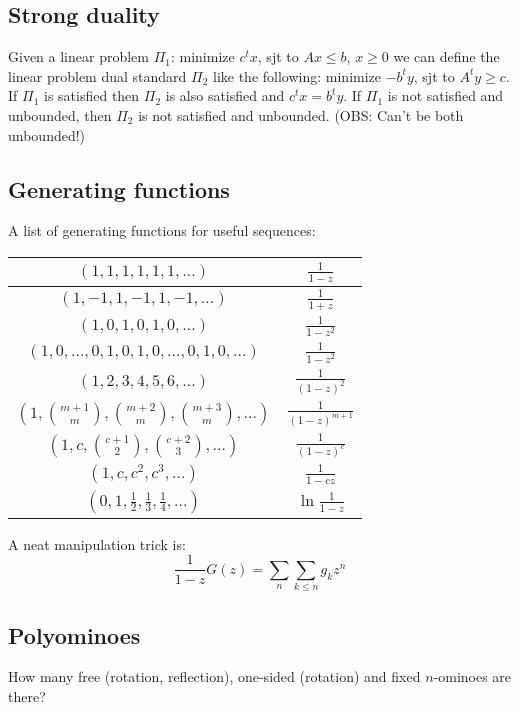   \subsection{Strong duality}
  Given a linear problem $\Pi_{1}$: minimize $c^t x$, sjt to $Ax \leq b$, $x \geq 0$ we can define the linear problem dual standard $\Pi_{2}$ like the following: minimize $-b^t y$, sjt to $A^t y \geq c$. If $\Pi_{1}$ is satisfied then $\Pi_{2}$ is also satisfied and $c^t x = b^t y$. If $\Pi_{1}$ is not satisfied and unbounded, then $\Pi_{2}$ is not satisfied and unbounded. (OBS: Can't be both unbounded!)

\subsection{Generating functions}
  A list of generating functions for useful sequences:

  \begin{tabular}{|c|c|}
    \hline
    $(1,1,1,1,1,1,\ldots)$ & $\frac{1}{1-z}$ \\ \hline
    $(1,-1,1,-1,1,-1,\ldots)$ & $\frac{1}{1+z}$ \\ \hline
    $(1,0,1,0,1,0,\ldots)$ & $\frac{1}{1-z^2}$ \\ \hline
    $(1,0,\ldots,0,1,0,1,0,\ldots,0,1,0,\ldots)$ & $\frac{1}{1-z^2}$ \\ \hline
    $(1,2,3,4,5,6,\ldots)$ & $\frac{1}{(1-z)^2}$ \\ \hline
    $(1,\binom{m+1}{m},\binom{m+2}{m},\binom{m+3}{m},\ldots)$ & $\frac{1}{(1-z)^{m+1}}$ \\ \hline
    $(1,c,\binom{c+1}{2},\binom{c+2}{3},\ldots)$ & $\frac{1}{(1-z)^c}$ \\ \hline
    $(1,c,c^2, c^3, \ldots)$ & $\frac{1}{1-cz}$ \\ \hline
    $(0,1,\frac{1}{2},\frac{1}{3},\frac{1}{4},\ldots)$ & $\ln \frac{1}{1-z}$ \\ \hline
  \end{tabular}

\columnbreak

A neat manipulation trick is:
\begin{equation*}
  \frac{1}{1-z}G(z) = \sum_{n}\sum_{k\leq n}g_kz^n
\end{equation*}

\subsection{Polyominoes} How many free (rotation, reflection), one-sided (rotation) and fixed $n$-ominoes are there?
      

